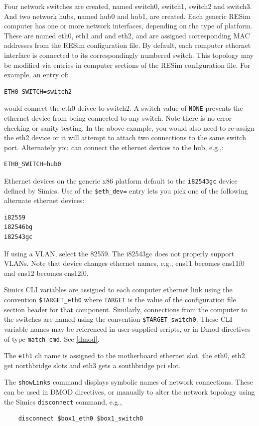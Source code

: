 \documentclass[titlepage]{article}
\begin{document}
Four network switches are created, named switch0, switch1, switch2 and switch3. And two network hubs, named hub0 and hub1, are created.  
Each generic RESim computer has one or more network interfaces,
depending on the type of platform.
These are named eth0, eth1 and and eth2, and are assigned corresponding MAC addresses from the
RESim configuration file. By default, each computer ethernet interface is connected to its correspondingly numbered switch.
This topology may be modified via entries in computer sections of the RESim configuration file.  For example, an entry of:
\begin{verbatim}
ETH0_SWITCH=switch2
\end{verbatim}
\noindent would connect the eth0 deivce to switch2.  A switch value of {\tt NONE} prevents the ethernet device from being connected
to any switch.  Note there is no error checking or sanity testing.  In the above example, you would also need to re-assign the eth2 device
or it will attempt to attach two connections to the same switch port.
Alternately you can connect the ethernet devices to the hub, e.g.,:
\begin{verbatim}
ETH0_SWITCH=hub0
\end{verbatim}

Ethernet devices on the generic x86 platform default to the {\tt i82543gc} device defined by Simics.  Use of the {\tt \$eth\_dev=} 
entry lets you pick one of the following alternate ethernet devices:
\begin{verbatim}
i82559
i82546bg
i82543gc
\end{verbatim}

If using a VLAN, select the 82559.  The i82543gc does not properly support VLANs.
Note that device changes ethernet names, e.g., ens11 becomes ens11f0 and ens12 becomes ens12f0.

Simics CLI variables are assigned to each computer ethernet link using the convention {\tt \$TARGET\_eth0} where {\tt TARGET}
is the value of the configuration file section header for that component.  Similarly, connections from the computer to the switches 
are named using the convention {\tt \$TARGET\_switch0}.  These CLI variable names may be referenced in user-supplied scripts, or in 
Dmod directives of type {\tt match\_cmd}.  See \ref{dmod}.

The {\tt eth1} cli name is assigned to the motherboard ethernet slot. the eth0, eth2 get northbridge slots and eth3 gets a southbridge pci slot.

The {\tt showLinks} command displays symbolic names of network connections.  These can be used in DMOD directives, or manually to alter
the network topology using the Simics {\tt disconnect} command, e.g., 
\begin{verbatim}
    disconnect $box1_eth0 $box1_switch0
\end{verbatim}
\end{document}
